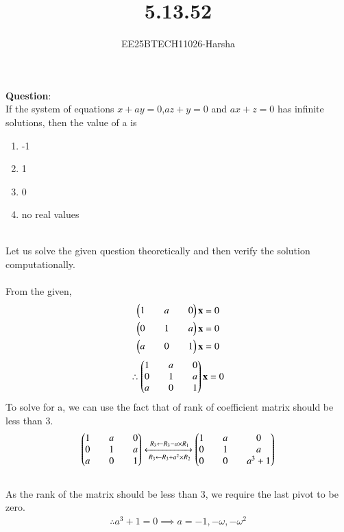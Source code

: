 \documentclass[journal]{IEEEtran}
\begin{document}

\vspace{3cm}

\title{5.13.52}
\author{EE25BTECH11026-Harsha}
 \maketitle
{\let\newpage\relax\maketitle}

\renewcommand{\thefigure}{\theenumi}
\renewcommand{\thetable}{\theenumi}
\setlength{\intextsep}{10pt} %


\renewcommand{\thetable}{\theenumi}

\textbf{Question}:\\
If the system of equations $x + ay = 0$,$az + y = 0$ and $ax + z = 0$ has infinite solutions, then the value of a is
\begin{multicols}{4}
\begin{enumerate}
    \item -1
    \item 1
    \item 0
    \item no real values
\end{enumerate}
\end{multicols}
\solution \\
Let us solve the given question theoretically and then verify the solution computationally.\\
\\
From the given,
\begin{align}
    \begin{pmatrix}1&&a&&0\end{pmatrix}\mathbf{x}=0\\
    \begin{pmatrix}0&&1&&a\end{pmatrix}\mathbf{x}=0\\
    \begin{pmatrix}a&&0&&1\end{pmatrix}\mathbf{x}=0
\end{align}
\begin{align}
    \therefore \begin{pmatrix}1&&a&&0\\0&&1&&a\\a&&0&&1\end{pmatrix}\mathbf{x}=0
\end{align}
To solve for a, we can use the fact that of rank of coefficient matrix should be less than 3.
\begin{align}
    \begin{pmatrix}1&&a&&0\\0&&1&&a\\a&&0&&1\end{pmatrix}
    \xleftrightarrow[\,R_3 \gets R_3+ a^2 \times R_2]{\, R_3 \gets R_3- a \times R_1}
    \begin{pmatrix}1&&a&&0\\0&&1&&a\\0&&0&&a^3+1\end{pmatrix}
\end{align}
\\
As the rank of the matrix should be less than 3, we require the last pivot to be zero.
\begin{align}
    \therefore a^3+1=0 \implies a=-1,-\omega,-\omega^2
\end{align}
\end{document}
